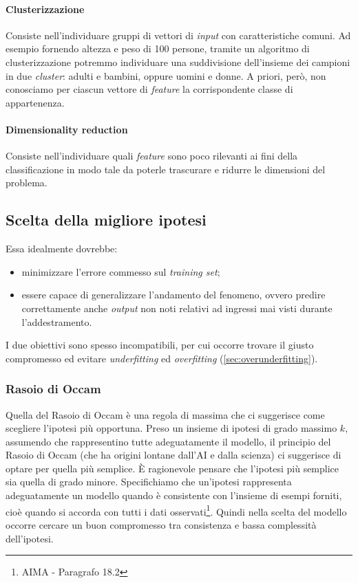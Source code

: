 \paragraph{Clusterizzazione}
Consiste nell'individuare gruppi di vettori di \emph{input} con caratteristiche comuni. Ad esempio fornendo altezza e peso di 100 persone, tramite un algoritmo di clusterizzazione potremmo individuare una suddivisione dell'insieme dei campioni in due \emph{cluster}: adulti e bambini, oppure uomini e donne. A priori, però, non conosciamo per ciascun vettore di \emph{feature} la corrispondente classe di appartenenza.

\paragraph{Dimensionality reduction}
Consiste nell'individuare quali \emph{feature} sono poco rilevanti ai fini della classificazione in modo tale da poterle trascurare e ridurre le dimensioni del problema.

\subsection{Scelta della migliore ipotesi}

Essa idealmente dovrebbe:
\begin{itemize}
  \item minimizzare l'errore commesso sul \emph{training set};
  \item essere capace di generalizzare l'andamento del fenomeno, ovvero predire correttamente anche \emph{output} non noti relativi ad ingressi mai visti durante l'addestramento.
  \end{itemize}
I due obiettivi sono spesso incompatibili, per cui occorre trovare il giusto compromesso ed evitare \emph{underfitting} ed \emph{overfitting} (\autoref{sec:overunderfitting}).

\subsubsection{Rasoio di Occam}
Quella del Rasoio di Occam è una regola di massima che ci suggerisce come scegliere l'ipotesi più opportuna. Preso un insieme di ipotesi di grado massimo $k$, assumendo che rappresentino tutte adeguatamente il modello, il principio del Rasoio di Occam (che ha origini lontane dall'AI e dalla scienza) ci suggerisce di optare per quella più semplice. È ragionevole pensare che l'ipotesi più semplice sia quella di grado minore. Specifichiamo che un'ipotesi rappresenta adeguatamente un modello quando è consistente con l'insieme di esempi forniti, cioè quando si accorda con tutti i dati osservati\footnote{AIMA - Paragrafo 18.2}. Quindi nella scelta del modello occorre cercare un buon compromesso tra consistenza e bassa complessità dell'ipotesi.

